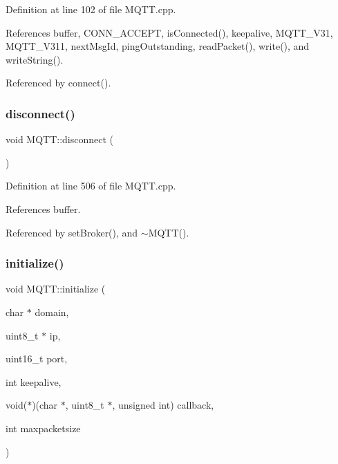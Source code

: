 Definition at line 102 of file M\+Q\+T\+T.\+cpp.



References buffer, C\+O\+N\+N\+\_\+\+A\+C\+C\+E\+PT, is\+Connected(), keepalive, M\+Q\+T\+T\+\_\+\+V31, M\+Q\+T\+T\+\_\+\+V311, next\+Msg\+Id, ping\+Outstanding, read\+Packet(), write(), and write\+String().



Referenced by connect().

\mbox{\label{class_m_q_t_t_a7d49b425517408d227836c10169f8df8}} 
\subsubsection{\texorpdfstring{disconnect()}{disconnect()}}
{\footnotesize\ttfamily void M\+Q\+T\+T\+::disconnect (\begin{DoxyParamCaption}{ }\end{DoxyParamCaption})}



Definition at line 506 of file M\+Q\+T\+T.\+cpp.



References buffer.



Referenced by set\+Broker(), and $\sim$\+M\+Q\+T\+T().

\mbox{\label{class_m_q_t_t_a849de76aa2a1f4b89c1b4a8dfb7c3661}} 
\subsubsection{\texorpdfstring{initialize()}{initialize()}}
{\footnotesize\ttfamily void M\+Q\+T\+T\+::initialize (\begin{DoxyParamCaption}\item[{char $\ast$}]{domain,  }\item[{uint8\+\_\+t $\ast$}]{ip,  }\item[{uint16\+\_\+t}]{port,  }\item[{int}]{keepalive,  }\item[{void($\ast$)(char $\ast$, uint8\+\_\+t $\ast$, unsigned int)}]{callback,  }\item[{int}]{maxpacketsize }\end{DoxyParamCaption})\hspace{0.3cm}{\ttfamily [private]}}



